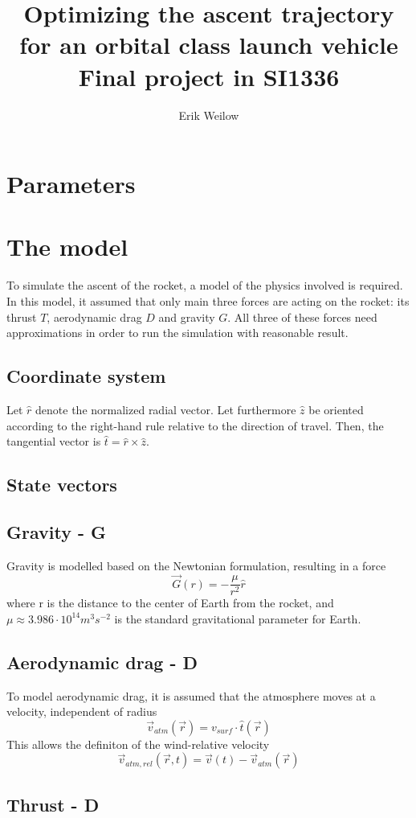 \documentclass[11pt]{article}
\title{%
  Optimizing the ascent trajectory for an orbital class launch vehicle \\
  \Large Final project in SI1336\\
}
\author{Erik Weilow}
\begin{document}
\maketitle
\newpage

\section{Parameters}

\section{The model}
To simulate the ascent of the rocket, a model of the physics involved is required.
In this model, it assumed that only main three forces are acting on the rocket: its thrust $T$, aerodynamic drag $D$ and gravity $G$.
All three of these forces need approximations in order to run the simulation with reasonable result.


\subsection{Coordinate system}
Let $\hat{r}$ denote the normalized radial vector.
Let furthermore $\hat{z}$ be oriented according to the right-hand rule relative to the direction of travel.
Then, the tangential vector is $\hat{t} = \hat{r} \times \hat{z}$.

\subsection{State vectors}

\subsection{Gravity - G}
Gravity is modelled based on the Newtonian formulation, resulting in a force
$$
\vec{G}(r) = -\frac{\mu}{r^2} \hat{r} 
$$
where r is the distance to the center of Earth from the rocket, and $\mu \approx 3.986\cdot10^{14} m^3 s^{−2}$ is the standard gravitational parameter for Earth.

\subsection{Aerodynamic drag - D}
To model aerodynamic drag, it is assumed that the atmosphere moves at a velocity, independent of radius
$$
\vec{v}_{atm} (\vec{r}) = v_{surf} \cdot \hat{t} (\vec{r})
$$
This allows the definiton of the wind-relative velocity
$$
\vec{v}_{atm,rel} (\vec{r}, t) = \vec{v} (t) - \vec{v}_{atm} (\vec{r})
$$
\subsection{Thrust - D}
\end{document}
